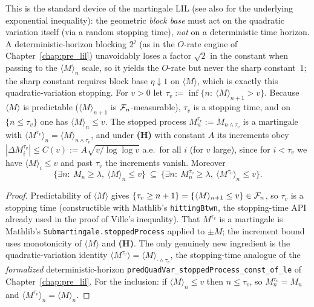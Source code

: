 \begin{lemma}\label{lem:llil_qv_stop}
This is the standard device of the martingale LIL \cite{Stout1970,HallHeyde1980} (see also
\cite{Freedman1975} for the underlying exponential inequality): the geometric \emph{block base}
must act on the quadratic variation itself (via a random stopping time), \emph{not} on a
deterministic time horizon. A deterministic-horizon blocking $2^j$ (as in the $O$-rate engine of
Chapter~\ref{chap:pre_lil}) unavoidably loses a factor $\sqrt2$ in the constant when passing to the
$\langle M\rangle_n$ scale, so it yields the $O$-rate but never the sharp constant~$1$; the
sharp constant requires block base $\eta\downarrow1$ on $\langle M\rangle$, which is exactly this
quadratic-variation stopping.
For $v>0$ let $\tau_v:=\inf\{n:\ \langle M\rangle_{n+1}>v\}$. Because $\langle M\rangle$
is predictable ($\langle M\rangle_{n+1}$ is $\mathcal{F}_n$-measurable), $\tau_v$ is a
stopping time, and on $\{n\le\tau_v\}$ one has $\langle M\rangle_n\le v$. The stopped
process $M^{\tau_v}_n:=M_{n\wedge\tau_v}$ is a martingale with
$\langle M^{\tau_v}\rangle_n=\langle M\rangle_{n\wedge\tau_v}$, and under \textbf{(H)}
with constant $A$ its increments obey $|\Delta M^{\tau_v}_i|\le C(v):=A\sqrt{v/\log\log v}$
a.e.\ for all $i$ (for $v$ large), since for $i<\tau_v$ we have $\langle M\rangle_i\le v$
and past $\tau_v$ the increments vanish. Moreover
\[
  \{\exists n:\ M_n\ge\lambda,\ \langle M\rangle_n\le v\}\ \subseteq\
  \{\exists n:\ M^{\tau_v}_n\ge\lambda,\ \langle M^{\tau_v}\rangle_n\le v\}.
\]
\end{lemma}
\begin{proof}
Predictability of $\langle M\rangle$ gives $\{\tau_v\ge n+1\}=\{\langle M\rangle_{n+1}
\le v\}\in\mathcal{F}_n$, so $\tau_v$ is a stopping time (constructible with Mathlib's
\texttt{hittingBtwn}, the stopping-time API already used in the proof of Ville's
inequality). That $M^{\tau_v}$ is a martingale is Mathlib's
\texttt{Submartingale.stoppedProcess} applied to $\pm M$; the increment bound uses
monotonicity of $\langle M\rangle$ and \textbf{(H)}. The only genuinely new ingredient is
the quadratic-variation identity $\langle M^{\tau_v}\rangle=\langle M\rangle_{\cdot\wedge
\tau_v}$, the stopping-time analogue of the \emph{formalized} deterministic-horizon
\texttt{predQuadVar\_stoppedProcess\_const\_of\_le} of Chapter~\ref{chap:pre_lil}. For the inclusion: if
$\langle M\rangle_n\le v$ then $n\le\tau_v$, so $M^{\tau_v}_n=M_n$ and
$\langle M^{\tau_v}\rangle_n=\langle M\rangle_n$.
\end{proof}

